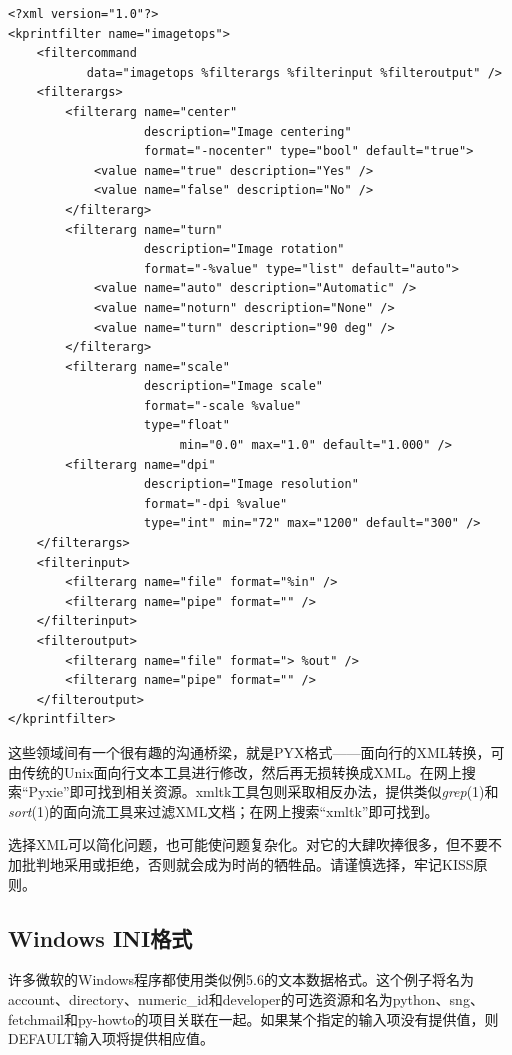 \documentclass[12pt,oneside]{book}
\begin{document}
\begin{Verbatim}[label=例5.5 XML实例]
<?xml version="1.0"?>
<kprintfilter name="imagetops">
    <filtercommand 
           data="imagetops %filterargs %filterinput %filteroutput" />
    <filterargs>
        <filterarg name="center" 
                   description="Image centering" 
                   format="-nocenter" type="bool" default="true">
            <value name="true" description="Yes" />
            <value name="false" description="No" />
        </filterarg>
        <filterarg name="turn" 
                   description="Image rotation" 
                   format="-%value" type="list" default="auto">
            <value name="auto" description="Automatic" />
            <value name="noturn" description="None" />
            <value name="turn" description="90 deg" />
        </filterarg>
        <filterarg name="scale" 
                   description="Image scale" 
                   format="-scale %value" 
                   type="float" 
                        min="0.0" max="1.0" default="1.000" />
        <filterarg name="dpi" 
                   description="Image resolution" 
                   format="-dpi %value" 
                   type="int" min="72" max="1200" default="300" />
    </filterargs>
    <filterinput>
        <filterarg name="file" format="%in" />
        <filterarg name="pipe" format="" />
    </filterinput>
    <filteroutput>
        <filterarg name="file" format="> %out" />
        <filterarg name="pipe" format="" />
    </filteroutput>
</kprintfilter>
\end{Verbatim}

这些领域间有一个很有趣的沟通桥梁，就是PYX格式——面向行的XML转换，可由传统的Unix面向行文本工具进行修改，然后再无损转换成XML。在网上搜索“Pyxie”即可找到相关资源。xmltk工具包则采取相反办法，提供类似\textit{grep}(1)和\textit{sort}(1)的面向流工具来过滤XML文档；在网上搜索“xmltk”即可找到。

选择XML可以简化问题，也可能使问题复杂化。对它的大肆吹捧很多，但不要不加批判地采用或拒绝，否则就会成为时尚的牺牲品。请谨慎选择，牢记KISS原则。


\subsection{Windows INI格式}
许多微软的Windows程序都使用类似例5.6的文本数据格式。这个例子将名为account、directory、numeric\_{}id和developer的可选资源和名为python、sng、fetchmail和py-howto的项目关联在一起。如果某个指定的输入项没有提供值，则DEFAULT输入项将提供相应值。
\end{document}
